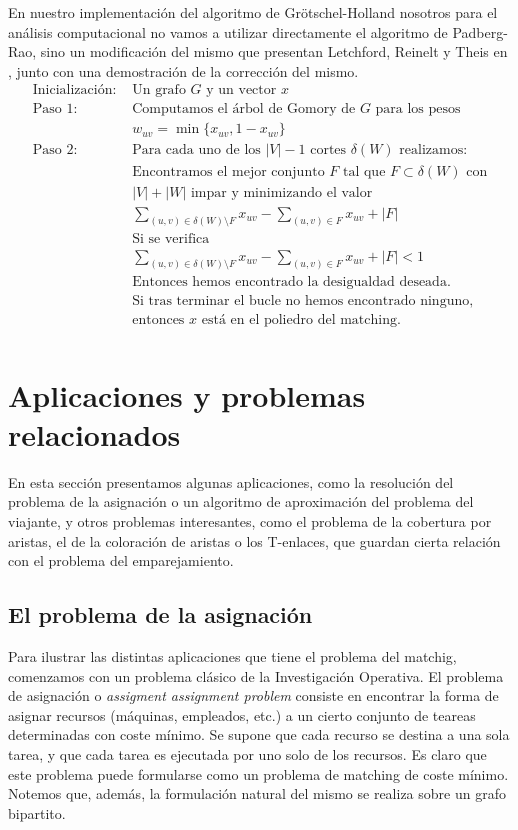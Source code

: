 \documentclass[twoside,a4paper,openright,12pt,tikz]{book}
\begin{document}
En nuestro implementación del algoritmo de Grötschel-Holland nosotros para el análisis computacional no vamos a utilizar directamente el algoritmo de Padberg-Rao, sino un modificación del mismo que presentan Letchford, Reinelt y Theis en \cite{adam}, junto con una demostración de la corrección del mismo.
\begin{align*}
\text{Inicialización: }&\text{Un grafo $G$ y un vector $x$}\\
\text{Paso 1: }&\text{Computamos el árbol de Gomory de $G$ para los pesos}\\
& w_{uv} = \min\{x_{uv},1-x_{uv}\}\\
\text{Paso 2: }&\text{Para cada uno de los $|V|-1$ cortes $\delta(W)$ realizamos:}\\
&\text{Encontramos el mejor conjunto $F$ tal que $F\subset \delta(W)$ con}\\
&\text{$|V|+|W|$ impar y minimizando el valor}\\
&\sum_{(u,v)\in \delta(W)\setminus F}x_{uv} - \sum_{(u,v)\in F}x_{uv} + |F|\\
&\text{Si se verifica}\\
&\sum_{(u,v)\in \delta(W)\setminus F}x_{uv} - \sum_{(u,v)\in F}x_{uv} +|F|<1\\
& \text{Entonces hemos encontrado la desigualdad deseada.}\\
&\text{Si tras terminar el bucle no hemos encontrado ninguno,}\\
&\text{entonces $x$ está en el poliedro del matching.}\\
\end{align*}


\section{Aplicaciones y problemas relacionados}
En esta sección presentamos algunas aplicaciones, como la resolución del problema de la asignación o un algoritmo de aproximación del problema del viajante, y otros problemas interesantes, como el problema de la cobertura por aristas, el de la coloración de aristas o los T-enlaces, que guardan cierta relación con el problema del emparejamiento.
\subsection{El problema de la asignación}
Para ilustrar las distintas aplicaciones que tiene el problema del matchig, comenzamos con un problema clásico de la Investigación Operativa. El problema de asignación o \textit{assigment assignment problem} consiste en encontrar la forma de asignar recursos (máquinas, empleados, etc.) a un cierto conjunto de teareas determinadas con coste mínimo. Se supone que cada recurso se destina a una sola tarea, y que cada tarea es ejecutada por uno solo de los recursos. Es claro que este problema puede formularse como un problema de matching de coste mínimo. Notemos que, además, la formulación natural del mismo se realiza sobre un grafo bipartito. 
\end{document}
